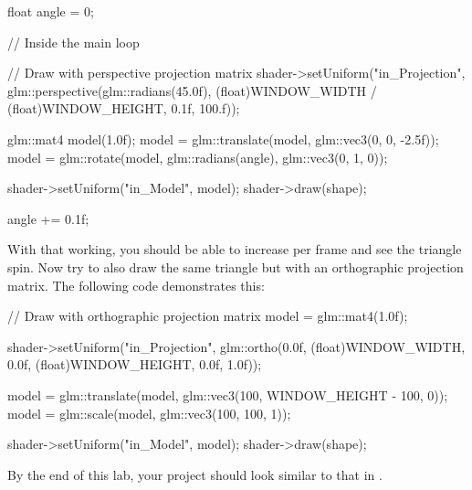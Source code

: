 \documentclass[10pt]{article}
\begin{document}
\begin{Code}

float angle = 0;

// Inside the main loop

// Draw with perspective projection matrix
shader->setUniform("in_Projection", glm::perspective(glm::radians(45.0f),
 (float)WINDOW_WIDTH / (float)WINDOW_HEIGHT, 0.1f, 100.f));

glm::mat4 model(1.0f);
model = glm::translate(model, glm::vec3(0, 0, -2.5f));
model = glm::rotate(model, glm::radians(angle), glm::vec3(0, 1, 0));

shader->setUniform("in_Model", model);
shader->draw(shape);

angle += 0.1f;

\end{Code}


With that working, you should be able to increase  per frame
and see the triangle spin. Now try to also draw the same triangle but with
an orthographic projection matrix.  The following code demonstrates this:

\begin{Code}

// Draw with orthographic projection matrix
model = glm::mat4(1.0f);

shader->setUniform("in_Projection", glm::ortho(0.0f,
  (float)WINDOW_WIDTH, 0.0f, (float)WINDOW_HEIGHT, 0.0f, 1.0f));

model = glm::translate(model, glm::vec3(100, WINDOW_HEIGHT - 100, 0));
model = glm::scale(model, glm::vec3(100, 100, 1));

shader->setUniform("in_Model", model);
shader->draw(shape);

\end{Code}

By the end of this lab, your project should look similar to that in .

\end{document}
